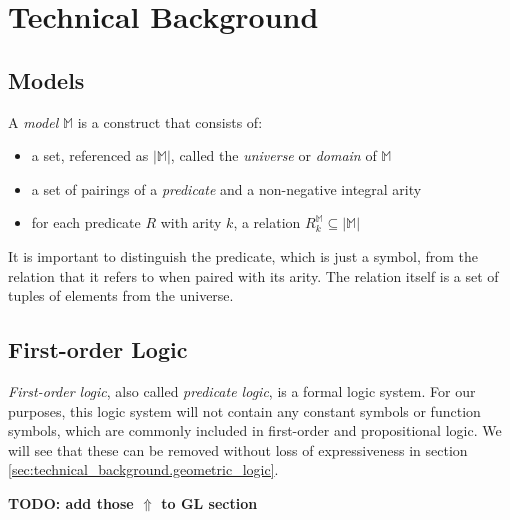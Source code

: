 \section{Technical Background}

	\subsection{Models}

		A \emph{model} $\mathbb{M}$ is a construct that consists of:
		\begin{itemize}
		\item a set, referenced as $|\mathbb{M}|$, called the \emph{universe} or \emph{domain} of $\mathbb{M}$
		\item a set of pairings of a \emph{predicate} and a non-negative integral arity
		\item for each predicate $R$ with arity $k$, a relation $R^\mathbb{M}_k \subseteq |\mathbb{M}|$
		\end{itemize}
		It is important to distinguish the predicate, which is just a symbol,
		from the relation that it refers to when paired with its arity. The
		relation itself is a set of tuples of elements from the universe.

	\subsection{First-order Logic}

		\emph{First-order logic}, also called \emph{predicate logic}, is a
		formal logic system. For our purposes, this logic system will not
		contain any constant symbols or function symbols, which are commonly
		included in first-order and propositional logic. We will see that these
		can be removed without loss of expressiveness in section
		\ref{sec:technical_background.geometric_logic}.

		\textbf{TODO: add those $\Uparrow$ to GL section}

